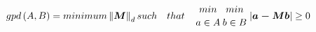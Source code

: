 \begin{equation}
 \begin{aligned}
 gpd\left( A,B \right) = minimum \left\Vert \boldsymbol{M} \right\Vert_d such \quad  that\quad  {min \atop {a \in A }} {min \atop {b \in B}} \left| \boldsymbol{a-Mb} \right|\geq0\label{eqn:gpd} 
\end{aligned}
\end{equation}
